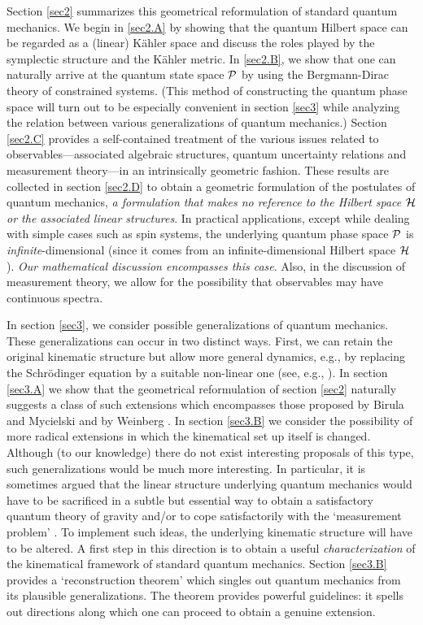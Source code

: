 \documentclass[12pt,aps,eqsecnum,tighten,nofootinbib]{revtex4-2}
\def\H{{\cal H}}
\def\P{{\cal P}}
\begin{document}
Section \ref{sec2} summarizes this geometrical reformulation of
standard quantum mechanics. We begin in \ref{sec2.A} by showing that
the quantum Hilbert space can be regarded as a (linear) K\"ahler space
and discuss the roles played by the symplectic structure and the
K\"ahler metric. In \ref{sec2.B}, we show that one can naturally
arrive at the quantum state space ${\cal P}$ by using the
Bergmann-Dirac theory of constrained systems. (This method of
constructing the quantum phase space will turn out to be especially
convenient in section \ref{sec3} while analyzing the relation between
various generalizations of quantum mechanics.) Section \ref{sec2.C}
provides a self-contained treatment of the various issues related to
observables---associated algebraic structures, quantum uncertainty
relations and measurement theory---in an intrinsically geometric
fashion. These results are collected in section \ref{sec2.D} to obtain
a geometric formulation of the postulates of quantum mechanics, {\it a
formulation that makes no reference to the Hilbert space $\H$ or the
associated linear structures}. In practical applications, except while
dealing with simple cases such as spin systems, the underlying quantum
phase space $\P$ is {\it infinite}-dimensional (since it comes from an
infinite-dimensional Hilbert space $\H$). {\it Our mathematical
discussion encompasses this case}. Also, in the discussion of
measurement theory, we allow for the possibility that observables may
have continuous spectra.

In section \ref{sec3}, we consider possible generalizations of quantum
mechanics. These generalizations can occur in two distinct
ways. First, we can retain the original kinematic structure but allow
more general dynamics, e.g., by replacing the Schr\"odinger equation
by a suitable non-linear one (see, e.g., \cite{birula}).  In section
\ref{sec3.A} we show that the geometrical reformulation of section
\ref{sec2} naturally suggests a class of such extensions which
encompasses those proposed by Birula and Mycielski \cite{birula} and
by Weinberg \cite{weinberg}. In section \ref{sec3.B} we consider the
possibility of more radical extensions in which the kinematical set up
itself is changed.  Although (to our knowledge) there do not exist
interesting proposals of this type, such generalizations would be much
more interesting.  In particular, it is sometimes argued that the
linear structure underlying quantum mechanics would have to be
sacrificed in a subtle but essential way to obtain a satisfactory
quantum theory of gravity and/or to cope satisfactorily with the
`measurement problem' \cite{rp1}. To implement such ideas, the
underlying kinematic structure will have to be altered.  A first step
in this direction is to obtain a useful {\it characterization} of the
kinematical framework of standard quantum mechanics. Section
\ref{sec3.B} provides a `reconstruction theorem' which singles out
quantum mechanics from its plausible generalizations. The theorem
provides powerful guidelines: it spells out directions along which one
can proceed to obtain a genuine extension.
\end{document}
